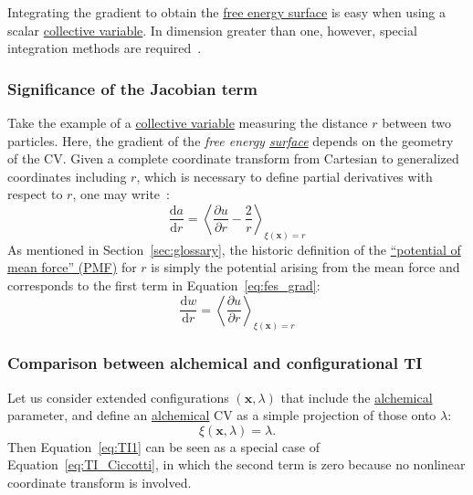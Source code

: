 \documentclass[9pt,review]{livecoms}
\newcommand{\vx}{\mathbf{x}}
\begin{document}
Integrating the gradient to obtain the \hyperlink{ref:FES} {free energy surface} is easy when using a scalar \hyperlink{ref:CV} {collective variable}. In dimension greater than one, however, special integration methods are required~\cite{Henin2021integration}.


\subsubsection{Significance of the Jacobian term}

Take the example of a \hyperlink{ref:CV} {collective variable} measuring the distance $r$ between two particles. Here, the gradient of the \textit{free energy \hyperlink{ref:FES} {surface}} depends on the geometry of the CV. Given a complete coordinate transform from Cartesian to generalized coordinates including $r$, which is necessary to define partial derivatives with respect to $r$, one may write~\cite{Henin2010a}:
\begin{equation}
    \frac{\mathrm{d}a}{\mathrm{d}r} = \left\langle \frac{\partial u}{\partial r}
    - \frac{2}{r} \right\rangle_{\xi(\vx) = r}
    \label{eq:fes_grad}
\end{equation}
As mentioned in Section~\ref{sec:glossary}, the historic definition of the \hyperlink{ref:PMF} {``potential of mean force'' (PMF)} for $r$ is simply the potential arising from the mean force and corresponds to the first term in Equation~\ref{eq:fes_grad}:
\begin{equation}
    \frac{\mathrm{d} w}{\mathrm{d} r} = \left\langle \frac{\partial u}{\partial r} \right\rangle_{\xi(\vx) = r}
    \label{eq:pmf_grad}
\end{equation}

\subsubsection{Comparison between alchemical and configurational TI}

Let us consider extended configurations $(\vx, \lambda)$ that include the \hyperlink{ref:Alchemical} {alchemical} parameter, and define an \hyperlink{ref:Alchemical} {alchemical} CV as a simple projection of those onto $\lambda$:
\begin{equation}
    \xi(\vx, \lambda) = \lambda .
\end{equation}
Then Equation~\ref{eq:TI1} can be seen as a special case of Equation~\ref{eq:TI_Ciccotti}, in which the second term is zero because no nonlinear coordinate transform is involved.
\end{document}
